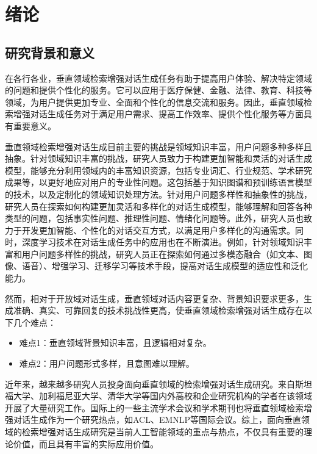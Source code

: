 \chapter{绪论}
%
\section{研究背景和意义}
%
在各行各业，垂直领域检索增强对话生成任务有助于提高用户体验、解决特定领域的问题和提供个性化的服务。它可以应用于医疗保健、金融、法律、教育、科技等领域，为用户提供更加专业、全面和个性化的信息交流和服务。因此，垂直领域检索增强对话生成任务对于满足用户需求、提高工作效率、提供个性化服务等方面具有重要意义。

垂直领域检索增强对话生成目前主要的挑战是领域知识丰富，用户问题多种多样且抽象。针对领域知识丰富的挑战，研究人员致力于构建更加智能和灵活的对话生成模型，能够充分利用领域内的丰富知识资源，包括专业词汇、行业规范、学术研究成果等，以更好地应对用户的专业性问题。这包括基于知识图谱和预训练语言模型的技术，以及定制化的领域知识处理方法。针对用户问题多样性和抽象性的挑战，研究人员在探索如何构建更加灵活和多样化的对话生成模型，能够理解和回答各种类型的问题，包括事实性问题、推理性问题、情绪化问题等。此外，研究人员也致力于开发更加智能、个性化的对话交互方式，以满足用户多样化的沟通需求。同时，深度学习技术在对话生成任务中的应用也在不断演进。例如，针对领域知识丰富和用户问题多样性的挑战，研究人员正在探索如何通过多模态融合（如文本、图像、语音）、增强学习、迁移学习等技术手段，提高对话生成模型的适应性和泛化能力。

然而，相对于开放域对话生成，垂直领域对话内容更复杂、背景知识要求更多，生成准确、真实、可靠回复的技术挑战性更高，使垂直领域检索增强对话生成存在以下几个难点：

\begin{itemize}[topsep = 0 pt, itemsep= 0 pt, parsep=0pt, partopsep=0pt, leftmargin=36pt, itemindent=0pt, labelsep=6pt, listparindent=24pt]
	\item 难点1：垂直领域背景知识丰富，且逻辑相对复杂。
	\item 难点2：用户问题形式多样，且意图难以理解。
\end{itemize}

近年来，越来越多研究人员投身面向垂直领域的检索增强对话生成研究。来自斯坦福大学、加利福尼亚大学、清华大学等国内外高校和企业研究机构的学者在该领域开展了大量研究工作。国际上的一些主流学术会议和学术期刊也将垂直领域检索增强对话生成作为一个研究热点，如ACL、EMNLP等国际会议。综上，面向垂直领域的检索增强对话生成研究是当前人工智能领域的重点与热点，不仅具有重要的理论价值，而且具有丰富的实际应用价值。

